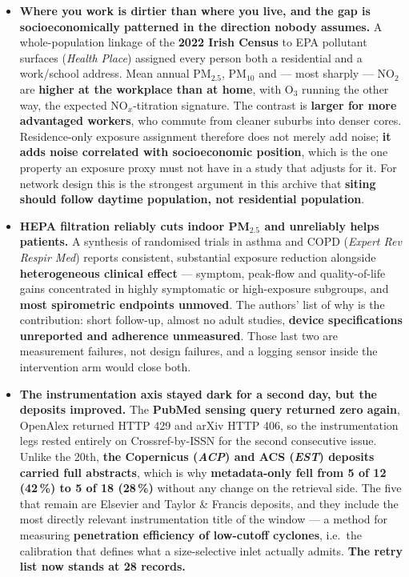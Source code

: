\documentclass[10pt]{article}
\begin{document}
\footnotesize
\begin{itemize}

\item \textbf{Where you work is dirtier than
where you live, and the gap is socioeconomically patterned in the direction nobody assumes.}
A whole-population linkage of the \textbf{2022 Irish Census} to EPA pollutant surfaces
(\textit{Health Place}) assigned every person both a residential and a work/school address.
Mean annual PM$_{2.5}$, PM$_{10}$ and --- most sharply --- NO$_2$ are \textbf{higher at the
workplace than at home}, with O$_3$ running the other way, the expected NO$_x$-titration
signature. The contrast is \textbf{larger for more advantaged workers}, who commute from
cleaner suburbs into denser cores. Residence-only exposure assignment therefore does not
merely add noise; \textbf{it adds noise correlated with socioeconomic position}, which is
the one property an exposure proxy must not have in a study that adjusts for it. For
network design this is the strongest argument in this archive that \textbf{siting should
follow daytime population, not residential population}.

\item \textbf{HEPA filtration reliably cuts
indoor PM$_{2.5}$ and unreliably helps patients.} A synthesis of randomised trials in
asthma and COPD (\textit{Expert Rev Respir Med}) reports consistent, substantial exposure
reduction alongside \textbf{heterogeneous clinical effect} --- symptom, peak-flow and
quality-of-life gains concentrated in highly symptomatic or high-exposure subgroups, and
\textbf{most spirometric endpoints unmoved}. The authors' list of why is the contribution:
short follow-up, almost no adult studies, \textbf{device specifications unreported and
adherence unmeasured}. Those last two are measurement failures, not design failures, and a
logging sensor inside the intervention arm would close both.

\item \textbf{The instrumentation axis stayed
dark for a second day, but the deposits improved.} The \textbf{PubMed sensing query
returned zero again}, OpenAlex returned HTTP 429 and arXiv HTTP 406, so the instrumentation
legs rested entirely on Crossref-by-ISSN for the second consecutive issue. Unlike the 20th,
\textbf{the Copernicus (\textit{ACP}) and ACS (\textit{EST}) deposits carried full
abstracts}, which is why \textbf{metadata-only fell from 5 of 12 (42\,\%) to 5 of 18
(28\,\%)} without any change on the retrieval side. The five that remain are Elsevier and
Taylor \& Francis deposits, and they include the most directly relevant instrumentation
title of the window --- a method for measuring \textbf{penetration efficiency of low-cutoff
cyclones}, i.e.\ the calibration that defines what a size-selective inlet actually admits.
\textbf{The retry list now stands at 28 records.}


\end{itemize}
\end{document}
